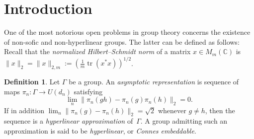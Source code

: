 \documentclass[11pt]{amsart}
\DeclareMathOperator{\tr}{tr}
\DeclareMathOperator{\SL}{SL}
\newcommand{\Z}{{\mathbb{Z}}}
\newcommand{\C}{{\mathbb{C}}}
\theoremstyle{definition}
\newtheorem{definition}[theorem]{Definition}
\theoremstyle{remark}
\theoremstyle{definition}
\begin{document}
\begin{abstract}
\end{abstract}

\maketitle


\section{Introduction}   \label{sec:intro}

One of the most notorious open problems in group theory concerns the existence of non-sofic and non-hyperlinear groups.
The latter can be defined as follows:
Recall that the \emph{normalized Hilbert--Schmidt norm} of a matrix $x \in M_m(\C)$ is $\| x \|_2 = \| x\|_{2,m} :=  (\frac{1}{m} \tr(x^*x))^{1/2}$.

\begin{definition}\label{def:hyperlinear}
Let $\Gamma$ be a group. An \emph{asymptotic representation} is sequence of maps \( \pi_n\colon\Gamma\longrightarrow U(d_n) \) satisfying
$$\lim_n\bigl\|\pi_n(gh)-\pi_n(g)\pi_n(h)\bigr\|_{2}=0.$$
If in addition
\(
\lim_n \bigl\|\pi_n(g)-\pi_n(h)\bigr\|_{2}=\sqrt2
\)
whenever $g\neq h$, then the sequence is a \emph{hyperlinear approximation} of~$\Gamma$. A group admitting such an approximation is said to be \emph{hyperlinear}, or \emph{Connes embeddable}.
\end{definition}
\end{document}
